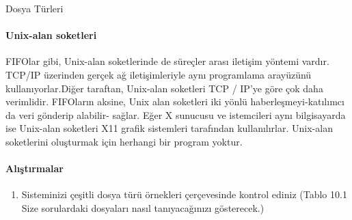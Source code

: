 \begin{section}{Dosya Türleri}
\paragraph{Unix-alan soketleri}{FIFOlar gibi, Unix-alan soketlerinde de süreçler arası iletişim yöntemi vardır. TCP/IP üzerinden gerçek ağ iletişimleriyle aynı programlama arayüzünü kullanıyorlar.Diğer taraftan, Unix-alan soketleri TCP / IP'ye göre çok daha verimlidir. FIFOların aksine, Unix alan soketleri iki yönlü haberleşmeyi-katılımcı da veri gönderip alabilir- sağlar. Eğer X sunucusu ve istemcileri aynı bilgisayarda ise Unix-alan soketleri X11 grafik sistemleri tarafından kullanılırlar. Unix-alan soketlerini oluşturmak için herhangi bir program yoktur.}

\paragraph{{\Huge{\PencilLeftDown}}Alıştırmalar}{
\begin{enumerate}
\item Sisteminizi çeşitli dosya türü örnekleri çerçevesinde kontrol ediniz (Tablo 10.1 Size sorulardaki dosyaları nasıl tanıyacağınızı gösterecek.)
\end{enumerate}}
\end{section}
